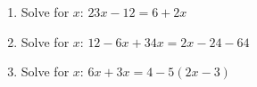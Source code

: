 \begin{enumerate}[noitemsep, label=\textbf{\arabic*}. ]
\label{m39241*uid18}\item Solve for \begin{math}x\end{math}: \begin{math}23x-12=6+2x\end{math}\hspace{1ex}        
\label{m39241*uid19}\item Solve for \begin{math}x\end{math}: \begin{math}12-6x+34x=2x-24-64\end{math}\hspace{1ex}        
\label{m39241*uid20}\item Solve for \begin{math}x\end{math}: \begin{math}6x+3x=4-5\left(2x-3\right)\end{math}\hspace{1ex}        


\end{enumerate}
